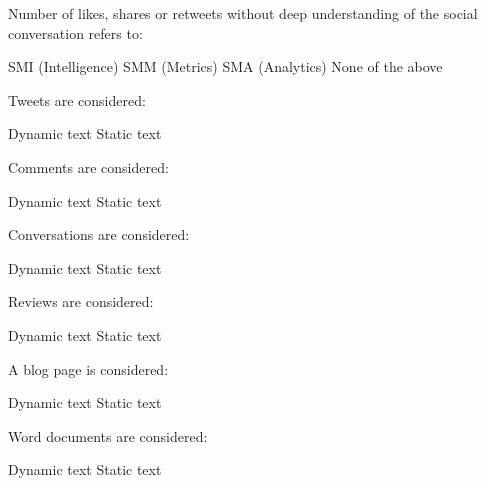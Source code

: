 \documentclass[theme=sleek, randomorder, hidesidemenu]{webquiz}
\begin{document}
\begin{question}
  Number of likes, shares or retweets without deep understanding of the social conversation refers to:
  \begin{choice}
    \incorrect SMI (Intelligence)
    \correct SMM (Metrics)
    \incorrect SMA (Analytics)
    \incorrect None of the above
  \end{choice}
\end{question}

\begin{question}
  Tweets are considered:
  \begin{choice}
    \correct Dynamic text
    \incorrect Static text
  \end{choice}
\end{question}

\begin{question}
  Comments are considered:
  \begin{choice}
    \correct Dynamic text
    \incorrect Static text
  \end{choice}
\end{question}

\begin{question}
  Conversations are considered:
  \begin{choice}
    \correct Dynamic text
    \incorrect Static text
  \end{choice}
\end{question}

\begin{question}
  Reviews are considered:
  \begin{choice}
    \correct Dynamic text
    \incorrect Static text
  \end{choice}
\end{question}

\begin{question}
  A blog page is considered:
  \begin{choice}
    \incorrect Dynamic text
    \correct Static text
  \end{choice}

\end{question}

\begin{question}
  Word documents are considered:
  \begin{choice}
    \incorrect Dynamic text
    \correct Static text
  \end{choice}
\end{question}
\end{document}
